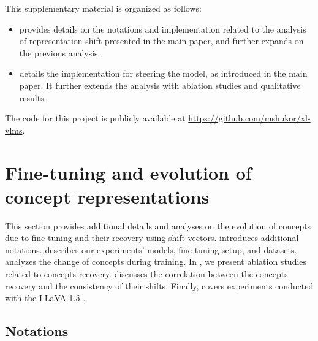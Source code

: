 \appendix


This supplementary material is organized as follows:
    \begin{itemize}
        \item {} provides details on the notations and implementation related to the analysis of representation shift presented in the main paper, and further expands on the previous analysis.

        \item  {} details the implementation for steering the model, as introduced in the main paper. It further extends the analysis with ablation studies and qualitative results.
    \end{itemize}

The code for this project is publicly available at \href{https://github.com/mshukor/xl-vlms/tree/main}{https://github.com/mshukor/xl-vlms}.

\section{Fine-tuning and evolution of concept representations}
\label{sec:app_analysis}

This section provides additional details and analyses on the evolution of concepts due to fine-tuning and their recovery using shift vectors.  introduces additional  notations.  describes our experiments' models, fine-tuning setup, and datasets.  analyzes the change of concepts during training. 
In , we present ablation studies related to concepts recovery.  discusses the correlation between the concepts recovery and the consistency of their shifts. Finally,  covers experiments conducted with the LLaVA-1.5 \cite{liu2024improvedllava}.


\subsection{Notations}
\label{sec:app_notations}

